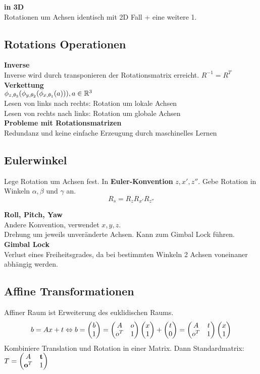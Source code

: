 \textbf{in 3D}\\
Rotationen um Achsen identisch mit 2D Fall + eine weitere 1.

\subsection{Rotations Operationen}
\textbf{Inverse}\\
Inverse wird durch transponieren der Rotationsmatrix erreicht. \(R^{-1} = R^T\)\\
\textbf{Verkettung}\\
\(\phi_{z, \theta_3}(\phi_{y, \theta_2}(\phi_{x, \theta_1}(a))), a \in \mathbb{R}^3\)\\
Lesen von links nach rechts: Rotation um lokale Achsen\\
Lesen von rechts nach links: Rotation um globale Achsen\\

\textbf{Probleme mit Rotationsmatrizen}\\
Redundanz und keine einfache Erzeugung durch maschinelles Lernen

\subsection{Eulerwinkel}
Lege Rotation um Achsen fest. In \textbf{Euler-Konvention} \(z, x', z''\).
Gebe Rotation in Winkeln \(\alpha, \beta\) und \(\gamma\) an.
\[ R_s = R_z R_{x'} R_{z''}\]

\textbf{Roll, Pitch, Yaw}\\
Andere Konvention, verwendet \(x, y, z\).\\
Drehung um jeweils unveränderte Achsen.
Kann zum Gimbal Lock führen.\\

\textbf{Gimbal Lock}\\
Verlust eines Freiheitsgrades, da bei bestimmten Winkeln 2 Achsen voneinaner abhängig werden.


\subsection{Affine Transformationen}
Affiner Raum ist Erweiterung des euklidischen Raums.
\begin{equation}
  b = Ax + t
    \Leftrightarrow
    b = \begin{pmatrix}b \\ 1\end{pmatrix} = \begin{pmatrix}A & o \\ o^T & 1\end{pmatrix} \begin{pmatrix}x \\ 1\end{pmatrix} + \begin{pmatrix}t \\ 0\end{pmatrix} =
    \begin{pmatrix}A & t \\ o^T & 1\end{pmatrix}\begin{pmatrix}x \\ 1\end{pmatrix}
\end{equation}
Kombiniere Translation und Rotation in einer Matrix. Dann Standardmatrix:
\(T = \begin{pmatrix}A & \mathbf{t} \\ \mathbf{o}^T & 1\end{pmatrix}\)\\

